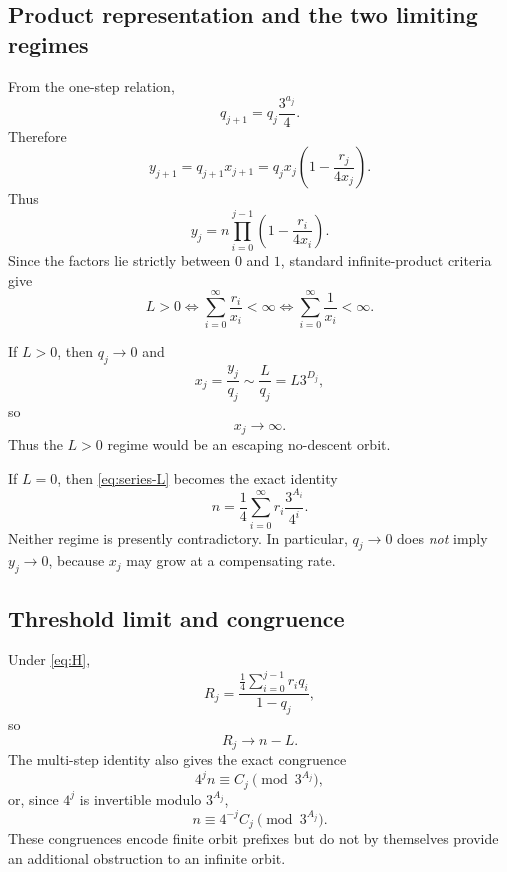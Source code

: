 \documentclass[11pt]{article}
\theoremstyle{definition}
\theoremstyle{remark}
\begin{document}
\subsection{Product representation and the two limiting regimes}

From the one-step relation,
\[
q_{j+1}=q_j\frac{3^{a_j}}4.
\]
Therefore
\[
y_{j+1}
=
q_{j+1}x_{j+1}
=
q_jx_j\left(1-\frac{r_j}{4x_j}\right).
\]
Thus
\begin{equation}
\boxed{
y_j
=
n\prod_{i=0}^{j-1}
\left(1-\frac{r_i}{4x_i}\right).
}
\label{eq:product}
\end{equation}
Since the factors lie strictly between $0$ and $1$, standard infinite-product criteria give
\begin{equation}
\boxed{
L>0
\iff
\sum_{i=0}^{\infty}\frac{r_i}{x_i}<\infty
\iff
\sum_{i=0}^{\infty}\frac1{x_i}<\infty.
}
\label{eq:Lcriterion}
\end{equation}

If $L>0$, then $q_j\to0$ and
\[
x_j=\frac{y_j}{q_j}\sim\frac{L}{q_j}=L3^{D_j},
\]
so
\begin{equation}
\boxed{x_j\to\infty.}
\label{eq:escape}
\end{equation}
Thus the $L>0$ regime would be an escaping no-descent orbit.

If $L=0$, then \eqref{eq:series-L} becomes the exact identity
\begin{equation}
\boxed{
n=\frac14\sum_{i=0}^{\infty}
r_i\frac{3^{A_i}}{4^i}.
}
\label{eq:Lzero-series}
\end{equation}
Neither regime is presently contradictory.  In particular, $q_j\to0$ does \emph{not} imply $y_j\to0$, because $x_j$ may grow at a compensating rate.

\subsection{Threshold limit and congruence}

Under \eqref{eq:H},
\[
R_j
=
\frac{\frac14\sum_{i=0}^{j-1}r_iq_i}{1-q_j},
\]
so
\begin{equation}
\boxed{R_j\to n-L.}
\label{eq:Rlimit}
\end{equation}
The multi-step identity also gives the exact congruence
\begin{equation}
\boxed{
4^jn\equiv C_j\pmod{3^{A_j}},
}
\label{eq:congruence}
\end{equation}
or, since $4^j$ is invertible modulo $3^{A_j}$,
\[
n\equiv4^{-j}C_j\pmod{3^{A_j}}.
\]
These congruences encode finite orbit prefixes but do not by themselves provide an additional obstruction to an infinite orbit.
\end{document}
